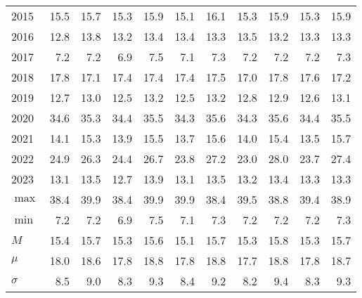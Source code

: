 \documentclass{article}
\begin{document}
\begin{table}[!ht]
\begin{tabular}{l| rr | rr| rr| rr| rr}
2015 & 15.5 & 15.7 & 15.3 & 15.9 & \cellcolor{red!25}15.1 & \cellcolor{green!25}16.1 & 15.3 & 15.9 & 15.3 & 15.9 \\
2016 & \cellcolor{red!25}12.8 & \cellcolor{green!25}13.8 & 13.2 & 13.4 & 13.4 & 13.3 & 13.5 & 13.2 & 13.3 & 13.3 \\
2017 & 7.2 & 7.2 & \cellcolor{red!25}6.9 & \cellcolor{green!25}7.5 & 7.1 & 7.3 & 7.2 & 7.2 & 7.2 & 7.3 \\
2018 & 17.8 & 17.1 & 17.4 & 17.4 & 17.4 & 17.5 & \cellcolor{red!25}17.0 & \cellcolor{green!25}17.8 & 17.6 & 17.2 \\
2019 & 12.7 & 13.0 & 12.5 & 13.2 & \cellcolor{red!25}12.5 & \cellcolor{green!25}13.2 & 12.8 & 12.9 & 12.6 & 13.1 \\
2020 & 34.6 & 35.3 & 34.4 & 35.5 & 34.3 & 35.6 & \cellcolor{red!25}34.3 & \cellcolor{green!25}35.6 & 34.4 & 35.5 \\
2021 & 14.1 & 15.3 & 13.9 & 15.5 & 13.7 & 15.6 & 14.0 & 15.4 & \cellcolor{red!25}13.5 & \cellcolor{green!25}15.7 \\
2022 & 24.9 & 26.3 & 24.4 & 26.7 & 23.8 & 27.2 & \cellcolor{red!25}23.0 & \cellcolor{green!25}28.0 & 23.7 & 27.4 \\
2023 & 13.1 & 13.5 & \cellcolor{red!25}12.7 & \cellcolor{green!25}13.9 & 13.1 & 13.5 & 13.2 & 13.4 & 13.3 & 13.3 \\ \hline
$\max$ & 38.4 & 39.9 & \cellcolor{red!25}38.4 & \cellcolor{green!25}39.9 & 39.9 & 38.4 & 39.5 & 38.8 & 39.4 & 38.9 \\
$\min$ & 7.2 & 7.2 & \cellcolor{red!25}6.9 & \cellcolor{green!25}7.5 & 7.1 & 7.3 & 7.2 & 7.2 & 7.2 & 7.3 \\
$M$ & 15.4 & 15.7 & 15.3 & 15.6 & \cellcolor{red!25}15.1 & 15.7 & 15.3 & \cellcolor{green!25}15.8 & 15.3 & 15.7 \\
$\mu$  & 18.0 & 18.6 & 17.8 & 18.8 & 17.8 & 18.8 & \cellcolor{red!25}17.7 & \cellcolor{green!25}18.8 & 17.8 & 18.7 \\
$\sigma$ & 8.5 & 9.0 & 8.3 & 9.3 & 8.4 & 9.2 & \cellcolor{red!25}8.2 & \cellcolor{green!25}9.4 & 8.3 & 9.3 \\


\hline
\end{tabular}
\end{table}
\end{document}

